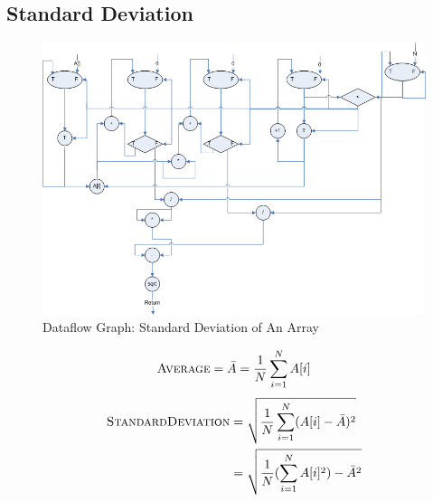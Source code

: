 \documentclass[12pt]{article}
\begin{document}
\subsection{Standard Deviation}
\begin{figure}[h!]
	\begin{center}
		\includegraphics[width=1.1\textwidth, angle=0]{std-deviation.png}
		\caption{\label{fig:std-deviation}Dataflow Graph: Standard Deviation of An Array}
	\end{center}
\end{figure}
\begin{equation}
\textsc{Average} = \bar{A} =  \frac{1}{N}\sum_{i=1}^{N}A[i]
\end{equation}
\begin{align}
\textsc{StandardDeviation} &= \sqrt{\frac{1}{N}\sum_{i=1}^{N}(A[i]-\bar{A})^{2}} \nonumber\\
&= \sqrt{\frac{1}{N}(\sum_{i=1}^{N}A[i]^{2})-\bar{A}^{2}}
\end{align}
\end{document}
